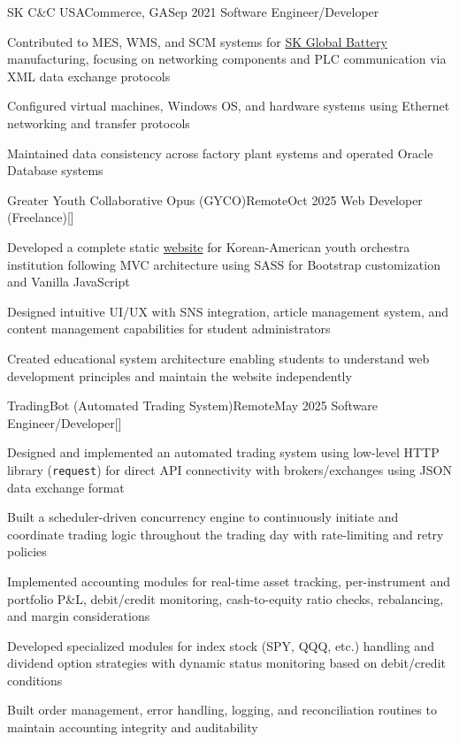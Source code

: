 \begin{resume-itemize}
  {SK C\&C USA}{Commerce, GA}{Sep 2021}
  {Software Engineer/Developer}
  \item Contributed to MES, WMS, and SCM systems for \href{https://www.skbatteryamerica.com/}{SK Global Battery} manufacturing, 
  focusing on networking components and PLC communication via XML data exchange protocols
  \item Configured virtual machines, Windows OS, and hardware systems using Ethernet networking and transfer protocols
  \item Maintained data consistency across factory plant systems and operated Oracle Database systems
\end{resume-itemize}
\begin{resume-itemize}
  {Greater Youth Collaborative Opus (GYCO)}{Remote}{Oct 2025}
  {Web Developer (Freelance)}[\href{https://github.com/kate-yk/kate-yk.github.io}{}]
  \item Developed a complete static \href{https://kate-yk.github.io/index.html}{website} for Korean-American youth orchestra institution 
  following MVC architecture using SASS for Bootstrap customization and Vanilla JavaScript
  \item Designed intuitive UI/UX with SNS integration, article management system, 
  and content management capabilities for student administrators
  \item Created educational system architecture enabling students to understand 
  web development principles and maintain the website independently
\end{resume-itemize}
\begin{resume-itemize}
  {TradingBot (Automated Trading System)}{Remote}{May 2025}
  {Software Engineer/Developer}[\href{https://github.com/YundaeLeeSong/ydjs-references/tree/main/project2505-app_tradingbot}{}]
  \item Designed and implemented an automated trading system using low-level HTTP library (\texttt{request}) 
  for direct API connectivity with brokers/exchanges using JSON data exchange format
  \item Built a scheduler-driven concurrency engine to continuously initiate and coordinate trading logic 
  throughout the trading day with rate-limiting and retry policies
  \item Implemented accounting modules for real-time asset tracking, per-instrument and portfolio P\&L, 
  debit/credit monitoring, cash-to-equity ratio checks, rebalancing, and margin considerations
  \item Developed specialized modules for index 
  stock (SPY, QQQ, etc.) handling and dividend option strategies 
  with dynamic status monitoring based on debit/credit conditions
  \item Built order management, error handling, logging, and reconciliation routines 
  to maintain accounting integrity and auditability
\end{resume-itemize}

